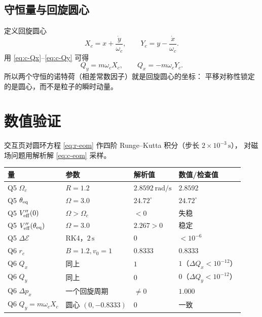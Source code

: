 \documentclass[UTF8,a4paper,11pt]{ctexart}
\begin{document}
\subsection{守恒量与回旋圆心}

定义回旋圆心
\begin{equation}
  X_c=x+\frac{\dot y}{\omega_c},\qquad
  Y_c=y-\frac{\dot x}{\omega_c}.
  \label{eq:c-center}
\end{equation}
用 \eqref{eq:c-Qx}--\eqref{eq:c-Qy} 可得
\begin{equation}
  Q_y=m\omega_c X_c,\qquad Q_x=-m\omega_c Y_c .
  \label{eq:c-center-Q}
\end{equation}
所以两个守恒的诺特荷（相差常数因子）就是回旋圆心的坐标：
平移对称性锁定的是圆心，而不是粒子的瞬时动量。

\section{数值验证}\label{sec:numeric}

交互页对圆环方程 \eqref{eq:r-eom} 作四阶 Runge--Kutta 积分（步长 $2\times10^{-3}\,\mathrm{s}$），
对磁场问题用解析解 \eqref{eq:c-eom} 采样。

\begin{center}
\small
\begin{tabular}{llll}
\toprule
量 & 参数 & 解析值 & 数值/检查值 \\
\midrule
Q5 $\Omega_c$ & $R=1.2$ & $2.8592\ \mathrm{rad/s}$ & $2.8592$ \\
Q5 $\theta_{\rm eq}$ & $\Omega=3.0$ & $24.72^\circ$ & $24.72^\circ$ \\
Q5 $V_{\rm eff}''(0)$ & $\Omega>\Omega_c$ & $<0$ & 失稳 \\
Q5 $V_{\rm eff}''(\theta_{\rm eq})$ & $\Omega=3.0$ & $2.267>0$ & 稳定 \\
Q5 $\Delta\mathcal E$ & RK4，$2\,\mathrm{s}$ & 0 & $<10^{-6}$ \\
Q6 $r_c$ & $B=1.2,v_0=1$ & $0.8333$ & $0.8333$ \\
Q6 $Q_x$ & 同上 & $1$ & $1$（$\Delta Q_x<10^{-12}$） \\
Q6 $Q_y$ & 同上 & $0$ & $0$（$\Delta Q_y<10^{-12}$） \\
Q6 $\Delta p_x$ & 一个回旋周期 & $\neq0$ & $1.000$ \\
Q6 $Q_y=m\omega_cX_c$ & 圆心 $(0,-0.8333)$ & $0$ & 一致 \\
\bottomrule
\end{tabular}
\end{center}
\end{document}
